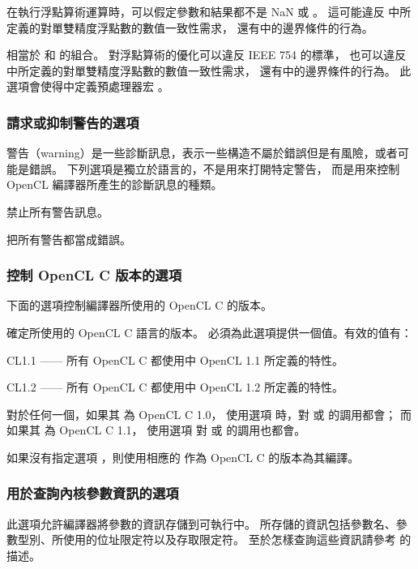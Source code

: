在執行浮點算術運算時，可以假定參數和結果都不是 NaN 或 \math{\pm\infty}。
這可能違反 中所定義的對單雙精度浮點數的數值一致性需求，
還有中的邊界條件的行為。
\stopclOption

相當於  和  的組合。
對浮點算術的優化可以違反 IEEE 754 的標準，
也可以違反 中所定義的對單雙精度浮點數的數值一致性需求，
還有中的邊界條件的行為。
此選項會使得中定義預處理器宏 。
\stopclOption

\subsubsection{請求或抑制警告的選項}

警告（warning）是一些診斷訊息，表示一些構造不屬於錯誤但是有風險，或者可能是錯誤。
下列選項是獨立於語言的，不是用來打開特定警告，
而是用來控制 OpenCL 編譯器所產生的診斷訊息的種類。

禁止所有警告訊息。
\stopclOption

把所有警告都當成錯誤。
\stopclOption

\subsubsection[sec:ctrlcveroption]{控制 OpenCL C 版本的選項}

下面的選項控制編譯器所使用的 OpenCL C 的版本。

確定所使用的 OpenCL C 語言的版本。
必須為此選項提供一個值。有效的值有：
\startigBase
\item CL1.1 —— 所有 OpenCL C 都使用中 OpenCL 1.1 所定義的特性。
\item CL1.2 —— 所有 OpenCL C 都使用中 OpenCL 1.2 所定義的特性。
\stopigBase
\stopclOption

對於任何一個，如果其  為 OpenCL C 1.0，
使用選項  時，對  或  的調用都會{}；
而如果其  為 OpenCL C 1.1，
使用選項  對  或  的調用也都會{}。

如果沒有指定選項 ，則使用相應的  作為 OpenCL C 的版本為其編譯。

\subsubsection{用於查詢內核參數資訊的選項}

此選項允許編譯器將參數的資訊存儲到可執行中。
所存儲的資訊包括參數名、參數型別、所使用的位址限定符以及存取限定符。
至於怎樣查詢這些資訊請參考  的描述。
\stopclOption

